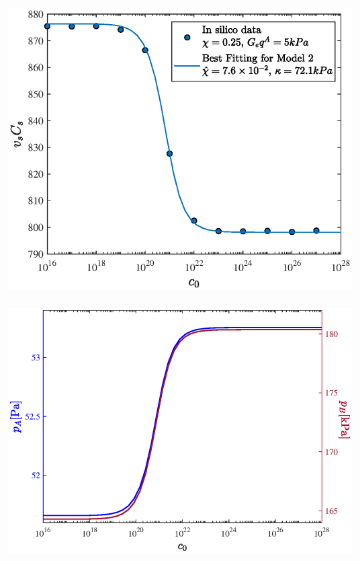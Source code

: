 \documentclass[runningheads]{llncs}
\begin{document}
\begin{figure}
	\begin{subfigure}{0.49\textwidth}
		\centering
		\includegraphics[scale=0.32]{images/chi2}
		\caption{}
	\end{subfigure}	
	\begin{subfigure}{0.49\textwidth}
		\centering
		\includegraphics[scale=0.285]{images/chi3p}
		\caption{}
	\end{subfigure}	


\end{figure}
\end{document}
